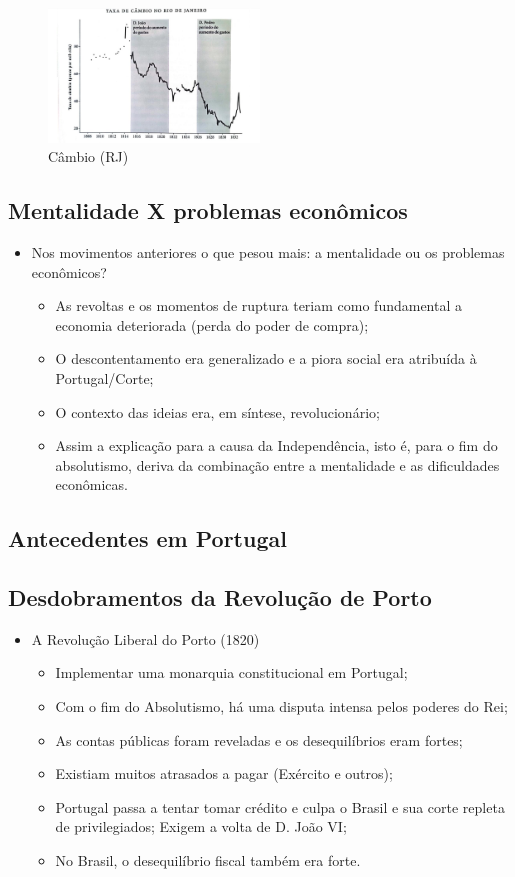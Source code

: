 \documentclass[a4paper,12pt]{article}[abntex2]
\begin{document}
\begin{figure}[H]
    \centering
    \includegraphics[width=0.5\textwidth]{Imagens Slides/i3a5.png}
    \caption{Câmbio (RJ)}
\end{figure}

\subsection{\textbf{Mentalidade X problemas econômicos}}
\begin{itemize}
    \item Nos movimentos anteriores o que pesou mais: a mentalidade ou os problemas econômicos? 
    \begin{itemize}
        \item As revoltas e os momentos de ruptura teriam como fundamental a
economia deteriorada (perda do poder de compra);
\item O descontentamento era generalizado e a piora social era atribuída à Portugal/Corte; 
\item O contexto das ideias era, em síntese, revolucionário;
\item Assim a explicação para a causa da Independência, isto é, para o fim do absolutismo, deriva da combinação entre a mentalidade e as dificuldades econômicas.
    \end{itemize}
\end{itemize}
\subsection{\textbf{Antecedentes em Portugal}}
\subsection{\textbf{Desdobramentos da Revolução de Porto}}
\begin{itemize}
    \item A Revolução Liberal do Porto (1820)
    \begin{itemize}
        \item Implementar uma monarquia constitucional em Portugal;
        \item Com o fim do Absolutismo, há uma disputa intensa pelos poderes do Rei;
\item As contas públicas foram reveladas e os desequilíbrios eram fortes;
\item Existiam muitos atrasados a pagar (Exército e outros);
\item Portugal passa a tentar tomar crédito e culpa o Brasil e sua corte repleta de privilegiados; Exigem a volta de D. João VI;
\item No Brasil, o desequilíbrio fiscal também era forte.
    \end{itemize}
\end{itemize}
\end{document}
